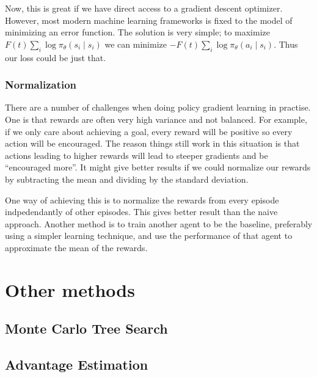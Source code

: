 \documentclass{article}
\theoremstyle{changedot}
\theoremstyle{changedotbreak}
\theoremstyle{nonumberplain}
\begin{document}
Now, this is great if we have direct access to a gradient descent optimizer. However, most modern machine learning frameworks is fixed to the model of minimizing an error function. The solution is very simple; to maximize $F(t) \sum_{i} \log \pi_{\theta} (s_{i} \mid s_{i})$ we can minimize $-F(t) \sum_{i} \log \pi_{\theta} (a_{i} \mid s_{i})$. Thus our loss could be just that.

\subsubsection{Normalization}
There are a number of challenges when doing policy gradient learning in practise. One is that rewards are often very high variance and not balanced. For example, if we only care about achieving a goal, every reward will be positive so every action will be encouraged. The reason things still work in this situation is that actions leading to higher rewards will lead to steeper gradients and be ``encouraged more''. It might give better results if we could normalize our rewards by subtracting the mean and dividing by the standard deviation.

One way of achieving this is to normalize the rewards from every episode indpedendantly of other episodes. This gives better result than the naive approach. Another method is to train another agent to be the baseline, preferably using a simpler learning technique, and use the performance of that agent to approximate the mean of the rewards.


\section{Other methods}

\subsection{Monte Carlo Tree Search}

\subsection{Advantage Estimation}




\end{document}
